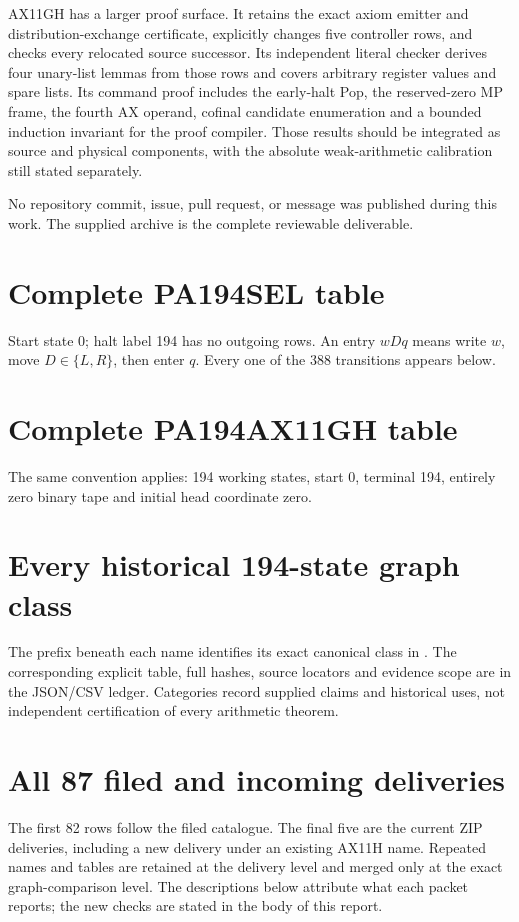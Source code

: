 \documentclass[10pt,letterpaper]{article}
\newcommand{\file}[1]{\path{#1}}
\begin{document}
AX11GH has a larger proof surface. It retains the exact axiom emitter and
distribution-exchange certificate, explicitly changes five controller
rows, and checks every relocated source successor. Its independent literal
checker derives four unary-list lemmas from those rows and covers arbitrary
register values and spare lists. Its command proof includes the early-halt
Pop, the reserved-zero MP frame, the fourth AX operand, cofinal candidate
enumeration and a bounded induction invariant for the proof compiler.
Those results should be integrated as source and physical components,
with the absolute weak-arithmetic calibration still stated separately.

No repository commit, issue, pull request, or message was published during
this work. The supplied archive is the complete reviewable deliverable.

\appendix
\clearpage\section{Complete PA194SEL table}\label{app:sel-table}
Start state 0; halt label 194 has no outgoing rows. An entry $wDq$ means
write $w$, move $D\in\{L,R\}$, then enter $q$. Every one of the 388
transitions appears below.

\clearpage\section{Complete PA194AX11GH table}\label{app:ax-table}
The same convention applies: 194 working states, start 0, terminal 194,
entirely zero binary tape and initial head coordinate zero.

\clearpage\section{Every historical 194-state graph class}\label{app:designs}
The prefix beneath each name identifies its exact canonical class in
\file{comparison/all_194_designs.json}. The corresponding explicit table,
full hashes, source locators and evidence scope are in the JSON/CSV ledger.
Categories record supplied claims and historical uses, not independent
certification of every arithmetic theorem.

\clearpage\section{All 87 filed and incoming deliveries}\label{app:packets}
The first 82 rows follow the filed catalogue. The final five are the current
ZIP deliveries, including a new delivery under an existing AX11H name.
Repeated names and tables are retained at the delivery level and merged
only at the exact graph-comparison level. The descriptions below attribute
what each packet reports; the new checks are stated in the body of this report.

\end{document}
